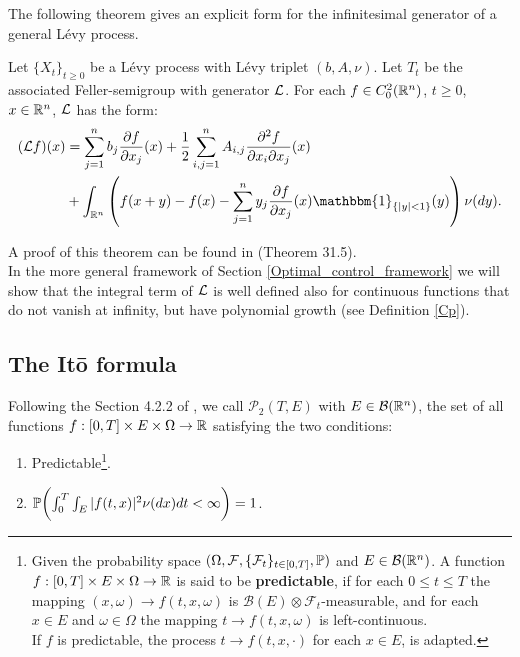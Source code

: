 The following theorem gives an explicit form for the infinitesimal generator 
of a general Lévy process.

\begin{Theorem}\label{Inf_gen_theorem}
 Let $\{X_t\}_{t \ge 0}$ be a Lévy process with Lévy triplet $(b,A,\nu)$. Let $T_t$ be the associated Feller-semigroup
 with generator $\mathcal{L}$. For each $f\in C_0^{2}(\mathbb{R}^n)$, $t\geq0$, $x\in \mathbb{R}^n$, 
  $\mathcal{L}$ has the form:
 \begin{align}\label{genLevy}
  (\LL f)(x) &=  \sum_{j=1}^n b_j \frac{\partial f}{\partial x_j}(x) +
  \frac{1}{2} \sum_{i,j=1}^n A_{i,j} \frac{\partial^2 f}{\partial x_i \partial x_j}(x)\\  
           & + \int_{\R^n} \left( f(x+y) - f(x) - \sum_{j=1}^n y_j \frac{\partial f}{\partial x_j}(x) 
           \mathbbm{1}_{\{ |y|<1 \}}(y) \right) \nu(dy).   \nonumber
  \end{align}
\end{Theorem}
A proof of this theorem can be found in \cite{Sato} (Theorem 31.5).\\

\noindent
In the more general framework of Section \ref{Optimal_control_framework} we will show that the integral term of 
$\mathcal{L}$ is well defined also for continuous functions that do not vanish at infinity, but have 
polynomial growth (see Definition \ref{Cp}). 


  
\subsection{The It\={o} formula} 

Following the Section 4.2.2 of \cite{Applebaum}, we call $\mathcal{P}_2(T,E)$ with $E \in \mathcal{B}(\mathbb{R}^n)$, 
the set of all functions $f:[0,T]\times E \times \Omega \to \mathbb{R}$ satisfying the two conditions:
\begin{enumerate}
 \item Predictable\footnote{Given the probability space $(\Omega,\mathcal{F},\{\mathcal{F}_t\}_{t\in [0,T]},\mathbb{P})$ and $E \in \mathcal{B}(\mathbb{R}^n)$. 
 A function $f:[0,T]\times E \times \Omega \to \mathbb{R}$
 is said to be \textbf{predictable}, if for each $0 \leq t \leq T$ the mapping $(x,\omega) \to f(t,x,\omega)$ is $\mathcal{B}(E)\otimes \mathcal{F}_t$-measurable,
 and for each $x\in E$ and $\omega \in \Omega$ the mapping $t \to f(t,x,\omega)$ is left-continuous.\\
 If $f$ is predictable, the process $t \to f(t,x,\cdot)$ for each $x \in E$, is adapted.}.
 \item  $\mathbb{P} \biggl( \int_0^T \int_E |f(t,x)|^2 \nu(dx) dt  <\infty \biggr) = 1 $.
\end{enumerate}

